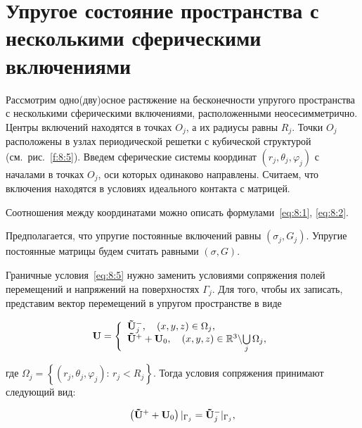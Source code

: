 \section{Упругое состояние пространства с несколькими сферическими включениями}


Рассмотрим одно(дву)осное растяжение на бесконечности упругого пространства с несколькими сферическими включениями, расположенными неосесимметрично. Центры включений находятся в точках $O_j$, а их радиусы равны $R_j$. Точки $O_j$ расположены в узлах периодической решетки с кубической структурой (см.~рис.~\ref{f:8:5}). Введем сферические системы координат $(r_j,\theta_j,\varphi_j)$ с началами в точках $O_j$, оси которых одинаково направлены. Считаем, что включения находятся в условиях идеального контакта с матрицей.

Соотношения между координатами можно описать формулами~\eqref{eq:8:1}, \eqref{eq:8:2}.

Предполагается, что упругие постоянные включений равны $(\sigma_j,G_j)$. Упругие постоянные матрицы будем считать равными $(\sigma,G)$.

Граничные условия~\eqref{eq:8:5} нужно заменить условиями сопряжения полей перемещений и напряжений на поверхностях $\Gamma_j$. Для того, чтобы их записать, представим вектор перемещений в упругом пространстве в виде

\begin{equation}
{\bf{U}} = \left\{ {\begin{array}{*{20}{l}}
{{\bf{\tilde U}}_j^ - ,\quad \left( {x,y,z} \right) \in {\Omega _j},}\\
{{{{\bf{\tilde U}}}^ + } + {{\bf{U}}_0},\quad \left( {x,y,z} \right) \in\mathbb{R}{^3}\backslash {\bigcup\limits_j\Omega _j},}
\end{array}} \right.
\label{eq:8:6}
\end{equation}

\noindent где ${\Omega _j} = \left\{ {\left( {{r_j},{\theta _j},{\varphi _j}} \right):\, {r_j} < {R_j}} \right\}$. Тогда условия сопряжения принимают следующий вид:

\begin{equation}
\left( {{{{\bf{\tilde U}}}^ + } + {{\bf{U}}_0}} \right){|_{{\Gamma _j}}} = {\bf{\tilde U}}_j^ - {|_{{\Gamma _j}}},
\label{eq:8:7}
\end{equation}

